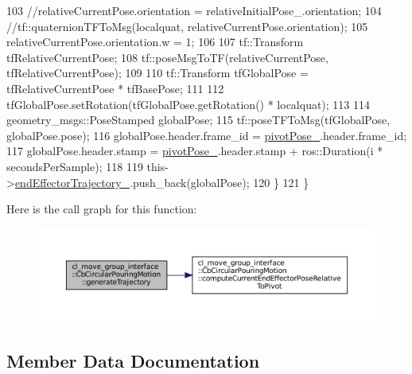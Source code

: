 \begin{DoxyCode}
103             \textcolor{comment}{//relativeCurrentPose.orientation = relativeInitialPose\_.orientation;}
104             \textcolor{comment}{//tf::quaternionTFToMsg(localquat, relativeCurrentPose.orientation);}
105             relativeCurrentPose.orientation.w = 1;
106 
107             tf::Transform tfRelativeCurrentPose;
108             tf::poseMsgToTF(relativeCurrentPose, tfRelativeCurrentPose);
109 
110             tf::Transform tfGlobalPose = tfRelativeCurrentPose * tfBasePose;
111 
112             tfGlobalPose.setRotation(tfGlobalPose.getRotation() * localquat);
113 
114             geometry\_msgs::PoseStamped globalPose;
115             tf::poseTFToMsg(tfGlobalPose, globalPose.pose);
116             globalPose.header.frame\_id = \hyperlink{classcl__move__group__interface_1_1CbCircularPouringMotion_a58ce9c29e4ef8f09a7569d6d8f9df56b}{pivotPose\_}.header.frame\_id;
117             globalPose.header.stamp = \hyperlink{classcl__move__group__interface_1_1CbCircularPouringMotion_a58ce9c29e4ef8f09a7569d6d8f9df56b}{pivotPose\_}.header.stamp + ros::Duration(i * 
      secondsPerSample);
118 
119             this->\hyperlink{classcl__move__group__interface_1_1CbMoveEndEffectorTrajectory_ae13dfd31ea3660646e03882f0c2c29f0}{endEffectorTrajectory\_}.push\_back(globalPose);
120         \}
121     \}
\end{DoxyCode}
Here is the call graph for this function\+:
\nopagebreak
\begin{figure}[H]
\begin{center}
\leavevmode
\includegraphics[width=350pt]{classcl__move__group__interface_1_1CbCircularPouringMotion_a9150bb3731082aad3af2d7d6e067a344_cgraph}
\end{center}
\end{figure}


\subsection{Member Data Documentation}
\mbox{\label{classcl__move__group__interface_1_1CbCircularPouringMotion_a7f69b3f95281fc14902117d637b59972}} 
